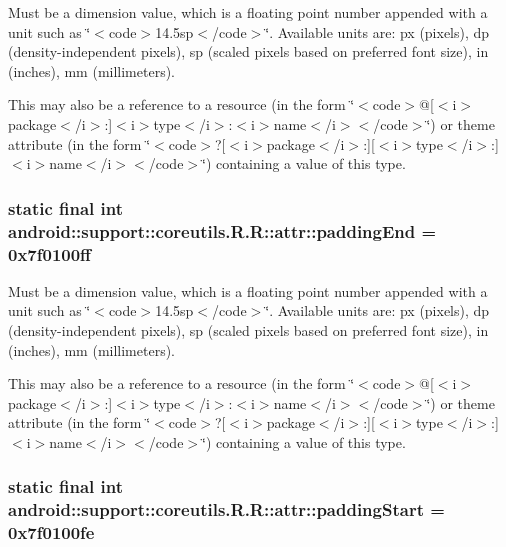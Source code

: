 Must be a dimension value, which is a floating point number appended with a unit such as \char`\"{}$<$code$>$14.5sp$<$/code$>$\char`\"{}. Available units are: px (pixels), dp (density-independent pixels), sp (scaled pixels based on preferred font size), in (inches), mm (millimeters). 

This may also be a reference to a resource (in the form \char`\"{}$<$code$>$@\mbox{[}$<$i$>$package$<$/i$>$:\mbox{]}$<$i$>$type$<$/i$>$:$<$i$>$name$<$/i$>$$<$/code$>$\char`\"{}) or theme attribute (in the form \char`\"{}$<$code$>$?\mbox{[}$<$i$>$package$<$/i$>$:\mbox{]}\mbox{[}$<$i$>$type$<$/i$>$:\mbox{]}$<$i$>$name$<$/i$>$$<$/code$>$\char`\"{}) containing a value of this type. \hypertarget{classandroid_1_1support_1_1coreutils_1_1_r_1_1attr_810238a672cfa60a77a448ddaef32569}{
\subsubsection[{paddingEnd}]{\setlength{\rightskip}{0pt plus 5cm}static final int android::support::coreutils.R.R::attr::paddingEnd = 0x7f0100ff}}
\label{classandroid_1_1support_1_1coreutils_1_1_r_1_1attr_810238a672cfa60a77a448ddaef32569}


Must be a dimension value, which is a floating point number appended with a unit such as \char`\"{}$<$code$>$14.5sp$<$/code$>$\char`\"{}. Available units are: px (pixels), dp (density-independent pixels), sp (scaled pixels based on preferred font size), in (inches), mm (millimeters). 

This may also be a reference to a resource (in the form \char`\"{}$<$code$>$@\mbox{[}$<$i$>$package$<$/i$>$:\mbox{]}$<$i$>$type$<$/i$>$:$<$i$>$name$<$/i$>$$<$/code$>$\char`\"{}) or theme attribute (in the form \char`\"{}$<$code$>$?\mbox{[}$<$i$>$package$<$/i$>$:\mbox{]}\mbox{[}$<$i$>$type$<$/i$>$:\mbox{]}$<$i$>$name$<$/i$>$$<$/code$>$\char`\"{}) containing a value of this type. \hypertarget{classandroid_1_1support_1_1coreutils_1_1_r_1_1attr_25bfdd5b2d98d98bcaf08875235aac79}{
\subsubsection[{paddingStart}]{\setlength{\rightskip}{0pt plus 5cm}static final int android::support::coreutils.R.R::attr::paddingStart = 0x7f0100fe}}
\label{classandroid_1_1support_1_1coreutils_1_1_r_1_1attr_25bfdd5b2d98d98bcaf08875235aac79}



